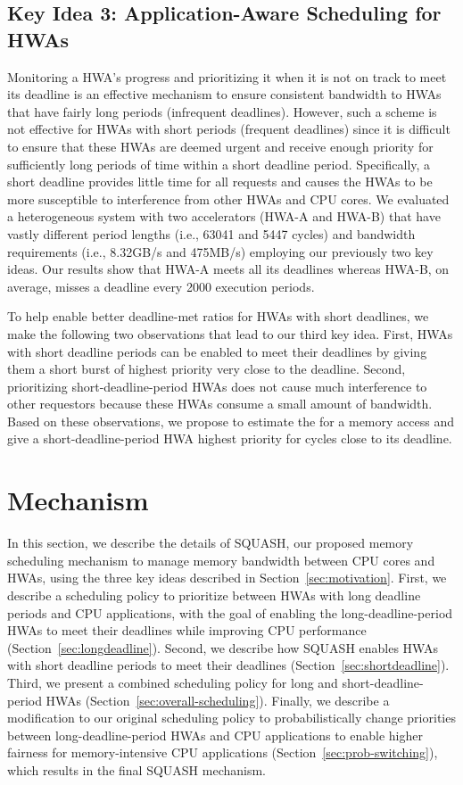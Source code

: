 \documentclass[10pt,letterpaper]{article}
\newcommand{\TMP}[1]{#1}
\begin{document}
\subsection{Key Idea 3: Application-Aware Scheduling for HWAs}
\label{sec:obs2}
\TMP{Monitoring a HWA's progress and prioritizing it when it is not on track to meet
its deadline is an effective mechanism to ensure consistent bandwidth to HWAs
that have fairly long periods (infrequent deadlines). However, such a scheme is
not effective for HWAs with short periods (frequent deadlines) since it is
difficult to ensure that these HWAs are deemed urgent and receive enough
priority for sufficiently long periods of time within a short deadline period.}
Specifically, a short deadline provides little time for all requests and
causes the HWAs to be more susceptible to interference from other HWAs and CPU
cores. We evaluated a heterogeneous system with two accelerators (HWA-A and
HWA-B) that have vastly different period lengths (i.e., 63041 and 5447 cycles)
and bandwidth requirements (i.e., 8.32GB/s and 475MB/s) employing our previously
two key ideas. Our results show that HWA-A meets all its deadlines whereas
HWA-B, on average, misses a deadline every 2000 execution periods.

To help enable better deadline-met ratios for HWAs with short deadlines, we make
the following two observations that lead to our third key idea. First, HWAs with
short deadline periods can be enabled to meet their deadlines by giving them a
short burst of highest priority very close to the deadline. Second, prioritizing
short-deadline-period HWAs does not cause much interference to other requestors
because these HWAs consume a small amount of
bandwidth. Based on these observations, we propose to estimate the
 for a memory access and give a short-deadline-period HWA
highest priority for  cycles close to its
deadline.
 \section{Mechanism}

In this section, we describe the details of SQUASH, our proposed memory
scheduling mechanism to manage memory bandwidth between CPU cores and HWAs,
using the three key ideas described in Section~\ref{sec:motivation}.
First, we describe a scheduling policy to prioritize between HWAs with
long deadline periods and CPU applications, with the goal of enabling the
long-deadline-period HWAs to meet their deadlines while improving CPU
performance (Section~\ref{sec:longdeadline}). Second, we describe how SQUASH
enables HWAs with short deadline periods to meet their deadlines
(Section~\ref{sec:shortdeadline}). Third, we present a combined scheduling policy for
long and short-deadline-period HWAs (Section~\ref{sec:overall-scheduling}). Finally, we
 describe a modification to our original scheduling policy to
probabilistically change priorities between long-deadline-period HWAs and CPU
applications to enable higher fairness for memory-intensive CPU applications
(Section~\ref{sec:prob-switching}), which results in the final SQUASH mechanism.
\end{document}
